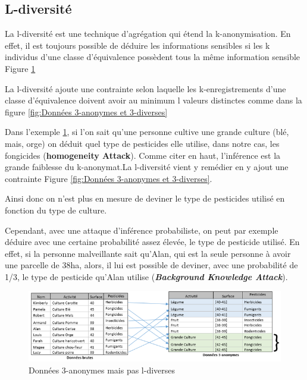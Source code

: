 \subsection{L-diversité}

La l-diversité est une technique d’agrégation qui étend la k-anonymisation. En effet, il est toujours possible de déduire les informations sensibles si les k individus d’une classe d’équivalence possèdent tous la même information sensible Figure \ref{fig:Données 3-anonymes mais pas l-diverses}

La l-diversité ajoute une contrainte selon laquelle les k-enregistrements d’une classe d’équivalence doivent avoir au minimum l valeurs distinctes comme dans la figure \ref{fig:Données 3-anonymes et 3-diverses}


Dans l’exemple \ref{fig:Données 3-anonymes mais pas l-diverses}, si l’on sait qu’une personne cultive une grande culture (blé, mais, orge) on déduit quel type de pesticides elle utilise, dans notre cas, les fongicides (\textbf{\textbf{homogeneity Attack}}).  Comme citer en haut, l’inférence est la grande faiblesse du k-anonymat.La l-diversité vient y remédier en y ajout une contrainte Figure \ref{fig:Données 3-anonymes et 3-diverses}. 

Ainsi donc on n’est plus en mesure de deviner le type de pesticides utilisé en fonction du type de culture.  

Cependant, avec une attaque d’inférence probabiliste, on peut par exemple déduire avec une certaine probabilité assez élevée, le type de pesticide utilisé. En effet, si la personne malveillante sait qu’Alan, qui est la seule personne à avoir une parcelle de 38ha, alors, il lui est possible de deviner, avec une probabilité de 1/3, le type de pesticide qu’Alan utilise (\textit{\textbf{Background Knowledge Attack}}). \cite{nguyen_techniques_2014}
\begin{figure}[!h]
    \centering
      \includegraphics[width=1\textwidth]{images/anonymisation/l_divers_image1.png}
    \caption{ Données 3-anonymes mais pas l-diverses}
     \label{fig:Données 3-anonymes mais pas l-diverses}
   
\end{figure}


